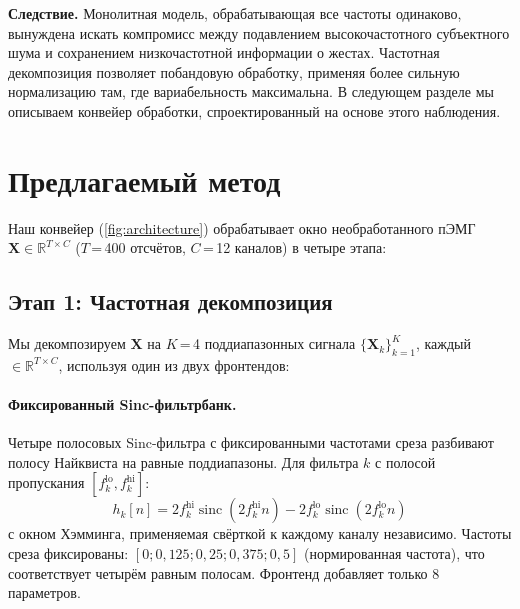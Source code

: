 \documentclass[conference]{IEEEtran}
\begin{document}
\textbf{Следствие.} Монолитная модель, обрабатывающая все частоты одинаково, вынуждена искать компромисс между подавлением высокочастотного субъектного шума и сохранением низкочастотной информации о жестах.
Частотная декомпозиция позволяет побандовую обработку, применяя более сильную нормализацию там, где вариабельность максимальна.
В следующем разделе мы описываем конвейер обработки, спроектированный на основе этого наблюдения.

\section{Предлагаемый метод}
\label{sec:method}



Наш конвейер (\cref{fig:architecture}) обрабатывает окно необработанного пЭМГ $\mathbf{X} \in \mathbb{R}^{T \times C}$ ($T$\,=\,400 отсчётов, $C$\,=\,12 каналов) в четыре этапа:

\subsection{Этап 1: Частотная декомпозиция}
Мы декомпозируем $\mathbf{X}$ на $K$\,=\,4 поддиапазонных сигнала $\{\mathbf{X}_k\}_{k=1}^{K}$, каждый $\in \mathbb{R}^{T \times C}$, используя один из двух фронтендов:

\paragraph{Фиксированный Sinc-фильтрбанк.}
Четыре полосовых Sinc-фильтра с фиксированными частотами среза разбивают полосу Найквиста на равные поддиапазоны.
Для фильтра $k$ с полосой пропускания $[f_k^{\mathrm{lo}}, f_k^{\mathrm{hi}}]$:
\begin{equation}
h_k[n] = 2f_k^{\mathrm{hi}} \operatorname{sinc}(2f_k^{\mathrm{hi}} n) - 2f_k^{\mathrm{lo}} \operatorname{sinc}(2f_k^{\mathrm{lo}} n)
\label{eq:sinc}
\end{equation}
с окном Хэмминга, применяемая свёрткой к каждому каналу независимо.
Частоты среза фиксированы: $[0; 0{,}125; 0{,}25; 0{,}375; 0{,}5]$ (нормированная частота), что соответствует четырём равным полосам.
Фронтенд добавляет только 8 параметров.
\end{document}

